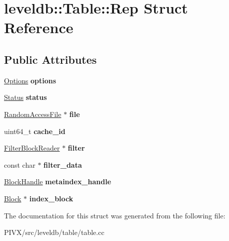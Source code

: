 \hypertarget{structleveldb_1_1_table_1_1_rep}{}\section{leveldb\+:\+:Table\+:\+:Rep Struct Reference}
\label{structleveldb_1_1_table_1_1_rep}
\subsection*{Public Attributes}
\begin{DoxyCompactItemize}
\item 
\mbox{\label{structleveldb_1_1_table_1_1_rep_a96ff2b389369e1b0706b090961065740}} 
\mbox{\hyperlink{structleveldb_1_1_options}{Options}} {\bfseries options}
\item 
\mbox{\label{structleveldb_1_1_table_1_1_rep_aceaddad6024db9f34af2358503e4c089}} 
\mbox{\hyperlink{classleveldb_1_1_status}{Status}} {\bfseries status}
\item 
\mbox{\label{structleveldb_1_1_table_1_1_rep_a5b96b0d545bb3dbe2bccdefab1a83092}} 
\mbox{\hyperlink{classleveldb_1_1_random_access_file}{Random\+Access\+File}} $\ast$ {\bfseries file}
\item 
\mbox{\label{structleveldb_1_1_table_1_1_rep_af5beb2186a60560f5381271ad53420b8}} 
uint64\+\_\+t {\bfseries cache\+\_\+id}
\item 
\mbox{\label{structleveldb_1_1_table_1_1_rep_a35acf83732a3dea3df5869cb05c1cb5f}} 
\mbox{\hyperlink{classleveldb_1_1_filter_block_reader}{Filter\+Block\+Reader}} $\ast$ {\bfseries filter}
\item 
\mbox{\label{structleveldb_1_1_table_1_1_rep_a2dd458aa96c0a357414f13354810cea9}} 
const char $\ast$ {\bfseries filter\+\_\+data}
\item 
\mbox{\label{structleveldb_1_1_table_1_1_rep_a11500653a2db8ba301bca5027a508789}} 
\mbox{\hyperlink{classleveldb_1_1_block_handle}{Block\+Handle}} {\bfseries metaindex\+\_\+handle}
\item 
\mbox{\label{structleveldb_1_1_table_1_1_rep_ae69d991c9b8ec7330b22acc06a932fe8}} 
\mbox{\hyperlink{classleveldb_1_1_block}{Block}} $\ast$ {\bfseries index\+\_\+block}
\end{DoxyCompactItemize}


The documentation for this struct was generated from the following file\+:\begin{DoxyCompactItemize}
\item 
P\+I\+V\+X/src/leveldb/table/table.\+cc\end{DoxyCompactItemize}
